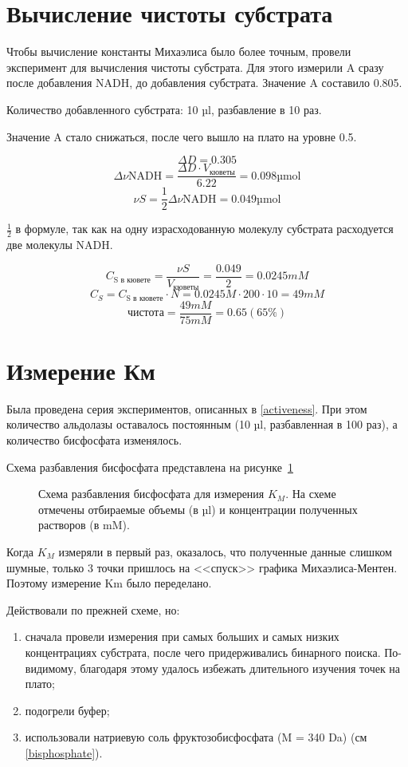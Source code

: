 
\section{Вычисление чистоты субстрата}
Чтобы вычисление константы Михаэлиса было более точным, провели
эксперимент для вычисления чистоты субстрата.
Для этого измерили A сразу после добавления NADH, до добавления субстрата.
Значение A составило 0.805.

Количество добавленного субстрата: 10 µl, разбавление в 10 раз.

Значение A стало снижаться, после чего вышло на плато на уровне 0.5.

$$ \Delta D = 0.305 $$
$$ \Delta \nu\text{NADH} = \frac{\Delta D \cdot V_\text{кюветы}}{6.22} = 0.098 \text{µmol} $$
$$ \nu S = \frac{1}{2} \Delta \nu\text{NADH} = 0.049 \text{µmol} $$

$\frac{1}{2}$ в формуле, так как на одну израсходованную молекулу субстрата
расходуется две молекулы NADH.

$$ C_\text{S в кювете} = \frac{\nu S}{V_\text{кюветы}} = \frac{0.049}{2} = 0.0245 mM $$
$$ C_S = C_\text{S в кювете} \cdot N = 0.0245 M \cdot 200 \cdot 10 = 49 mM $$
$$ \text{чистота} = \frac{49 mM}{75 mM} = 0.65 (65 \%) $$


\section{Измерение Км}

Была проведена серия экспериментов, описанных в \ref{activeness}.
При этом количество альдолазы оставалось постоянным (10 µl, разбавленная в 100 раз),
а количество бисфосфата изменялось.

Схема разбавления бисфосфата представлена на рисунке~\ref{km-dilution}

\begin{figure}[htbp]
\def\svgwidth{\linewidth}
\caption[Схема разбавления бисфосфата для измерения $K_M$]
    {Схема разбавления бисфосфата для измерения $K_M$.
    На схеме отмечены отбираемые объемы (в µl) и
    концентрации полученных растворов (в mM).}
\label{km-dilution}
\end{figure}

Когда $K_M$ измеряли в первый раз, оказалось,
что полученные данные слишком шумные,
только 3 точки пришлось на <<спуск>> графика Михаэлиса-Ментен.
Поэтому измерение Km было переделано.

Действовали по прежней схеме, но:
\begin{enumerate}
\item сначала провели измерения при самых больших и самых низких концентрациях субстрата,
    после чего придерживались бинарного поиска.
    По-видимому, благодаря этому удалось избежать длительного изучения точек на плато;
\item подогрели буфер;
\item использовали натриевую соль фруктозобисфосфата (M = 340 Da) (см \ref{bisphosphate}).
\end{enumerate}

